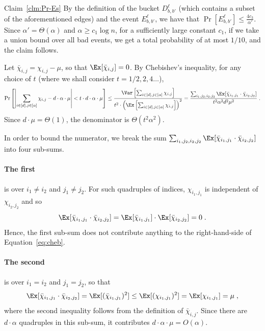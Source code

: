 \begin{proofof}{Claim~\ref{clm:Pr-Es}}
By the definition of the bucket $D_{b,b'}^\ell$ (which contains a subset of the aforementioned edges) and the event $E^\ell_{b,b'}$, we have that $\Pr[E_{b,b'}^\ell] \leq \frac{4c_3}{\alpha'}$.
Since $\alpha' = \Theta(\alpha)$ and $\alpha \geq c_1\log n$, for a sufficiently large constant $c_1$, if we take a union bound over all bad events, we get a total probability of at most $1/10$, and the claim follows.
\end{proofof}
\iffalse
Let $\bar{\chi}_{i,j} = \chi_{i,j} - \mu$, so that $\Ex[\bar{\chi}_{i,j}] = 0$.
By Chebishev's inequality, for any choice of $t$ (where we shall consider $t=1/2,2,4\dots$),
\begin{equation}\label{eq:cheb}
\Pr\left[\left|\sum_{i\in [d],j\in [\alpha]}\chi_{i,j} - d\cdot \alpha\cdot \mu\right|< t\cdot d\cdot \alpha\cdot \mu \right] \leq \frac{\Var\left[\sum_{i\in [d],j\in [\alpha]}\chi_{i,j}\right]}{t^2\cdot \left(\Ex\left[\sum_{i\in [d],j\in [\alpha]} \chi_{i,j}\right]\right)^2}
= \frac{\sum_{i_1,j_2,i_2,j_2} \Ex[\bar{\chi}_{i_1,j_1}\cdot \bar{\chi}_{i_2,j_2}]}{t^2 \alpha^2 d^2 \mu^2} \;.
\end{equation}
Since $d \cdot \mu = \Theta(1)$, the  denominator is $\Theta(t^2 \alpha^2)$.

In order to bound the numerator,
we break the sum $\sum_{i_1,j_2,i_2,j_2} \Ex[\bar{\chi}_{i_1,j_1}\cdot \bar{\chi}_{i_2,j_2}]$ into four sub-sums.
\paragraph{The first} is over $i_1\neq i_2$ and $j_1 \neq j_2$. For such quadruples of indices, $\chi_{i_1,j_1}$ is independent of $\chi_{i_2,j_2}$ and so
\begin{equation}\label{eq:cheb-C4-lb-case1}
\Ex[\bar{\chi}_{i_1,j_1}\cdot \bar{\chi}_{i_2,j_2}] =  \Ex[\bar{\chi}_{i_1,j_1}]\cdot \Ex[\bar{\chi}_{i_2,j_2}] = 0\;.
\end{equation}
Hence, the first sub-sum does not contribute anything to the right-hand-side of Equation~\eqref{eq:cheb}.

\paragraph{The second} is over $i_1 = i_2$ and $j_1 = j_2$, so that
\begin{equation}\label{eq:cheb-C4-lb2-case2}
\Ex[\bar{\chi}_{i_1,j_1}\cdot \bar{\chi}_{i_2,j_2}] = \Ex[(\bar{\chi}_{i_1,j_1})^2]
\leq \Ex[(\chi_{i_1,j_1})^2] = \Ex[\chi_{i_1,j_1}] = \mu \;,
\end{equation}
where the second inequality follows from the definition of $\bar{\chi}_{i,j}$.
Since there are $d\cdot \alpha$ quadruples in this sub-sum, it contributes $d\cdot\alpha\cdot \mu = O(\alpha)$.

